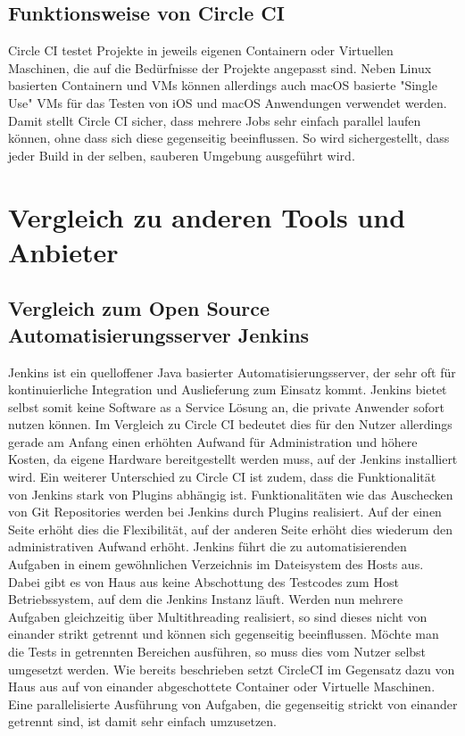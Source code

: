 \documentclass[11pt]{article}
\begin{document}
\subsection{Funktionsweise von Circle CI}
Circle CI testet Projekte in jeweils eigenen Containern oder Virtuellen Maschinen, die auf die Bedürfnisse
der Projekte angepasst sind. Neben Linux basierten Containern und VMs können allerdings auch macOS
basierte "Single Use" VMs für das Testen von iOS und macOS Anwendungen verwendet werden.
Damit stellt Circle CI sicher, dass mehrere Jobs sehr einfach parallel laufen können, ohne dass sich
diese gegenseitig beeinflussen. So wird sichergestellt, dass jeder Build in der selben, sauberen
Umgebung ausgeführt wird.

\section {Vergleich zu anderen Tools und Anbieter}
\subsection {Vergleich zum Open Source Automatisierungsserver Jenkins}
Jenkins ist ein quelloffener Java basierter Automatisierungsserver, der sehr oft für kontinuierliche
Integration und Auslieferung zum Einsatz kommt.
Jenkins bietet selbst somit keine Software as a Service Lösung an, die private Anwender sofort nutzen
können.
Im Vergleich zu Circle CI bedeutet dies für den Nutzer allerdings gerade am Anfang einen erhöhten
Aufwand für Administration und höhere Kosten, da eigene 
Hardware bereitgestellt werden muss, auf der Jenkins installiert wird. Ein weiterer Unterschied zu Circle CI
ist zudem, dass die Funktionalität von Jenkins stark von Plugins abhängig ist. Funktionalitäten wie das
Auschecken von Git Repositories werden bei Jenkins durch Plugins realisiert.
Auf der einen Seite erhöht dies die Flexibilität, auf der anderen Seite erhöht dies wiederum den
administrativen Aufwand erhöht. Jenkins führt die zu automatisierenden Aufgaben in einem gewöhnlichen
Verzeichnis im Dateisystem des Hosts aus. Dabei gibt es von Haus aus keine Abschottung des Testcodes zum
Host Betriebssystem, auf dem die Jenkins Instanz läuft. Werden nun mehrere Aufgaben gleichzeitig über
Multithreading realisiert, so sind dieses nicht von einander strikt getrennt und können sich gegenseitig
beeinflussen. Möchte man die Tests in getrennten Bereichen ausführen, so muss dies vom Nutzer selbst
umgesetzt werden. Wie bereits beschrieben setzt CircleCI im Gegensatz dazu von Haus aus auf von einander
abgeschottete Container oder Virtuelle Maschinen. Eine parallelisierte Ausführung von Aufgaben, die
gegenseitig strickt von einander getrennt sind, ist damit sehr einfach umzusetzen.
\end{document}
